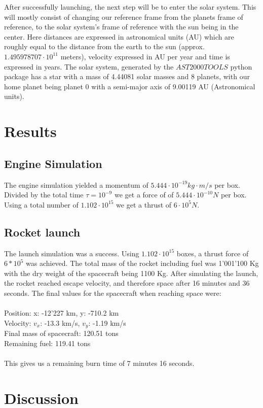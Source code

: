 \documentclass[reprint,english,notitlepage]{revtex4-2}
\begin{document}
After successfully launching, the next step will be to enter the solar system.
This will mostly consist of changing our reference frame from the planets frame of reference, to the solar system's frame of reference with the sun being in the center.
Here distances are expressed in astronomical units (AU) which are roughly equal to the distance from the earth to the sun (approx. $1.495978707 \cdot 10^{11}$ meters), velocity expressed in AU per year and time is expressed in years.
The solar system, generated by the $AST2000TOOLS$ python package has a star with a mass of 4.44081 solar masses and 8 planets, with our home planet being planet 0 with a semi-major axis of 9.00119 AU (Astronomical units).

\section{Results}
	\subsection{Engine Simulation}
	The engine simulation yielded a momentum of $ 5.444 \cdot 10^{-19}kg \cdot  m / s $ per box.
	Divided by the total time $ \tau = 10^{-9}$ we get a force of of $5.444 \cdot 10^{-10}N $ per box.
	Using a total number of $ 1.102 \cdot  10^{15} $ we get a thrust of $ 6 \cdot  10^{5} N $.

	\subsection{Rocket launch}
	The launch simulation was a success.
	Using $1.102 \cdot  10^{15}$ boxes, a thrust force of $6*10^5$ was achieved.
	The total mass of the rocket including fuel was 1'001'100 Kg with the dry weight of the spacecraft being 1100 Kg.
	After simulating the launch, the rocket reached escape velocity, and therefore space after 16 minutes and 36 seconds.
	The final values for the spacecraft when reaching space were:\\\\
	Position: x: -12'227 km, y: -710.2 km\\
	Velocity: $v_x$: -13.3 km/s, $v_y$: -1.19 km/s\\
	Final mass of spacecraft: 120.51 tons\\
	Remaining fuel: 119.41 tons\\\\
	This gives us a remaining burn time of 7 minutes 16 seconds.


\section{Discussion}
\end{document}
